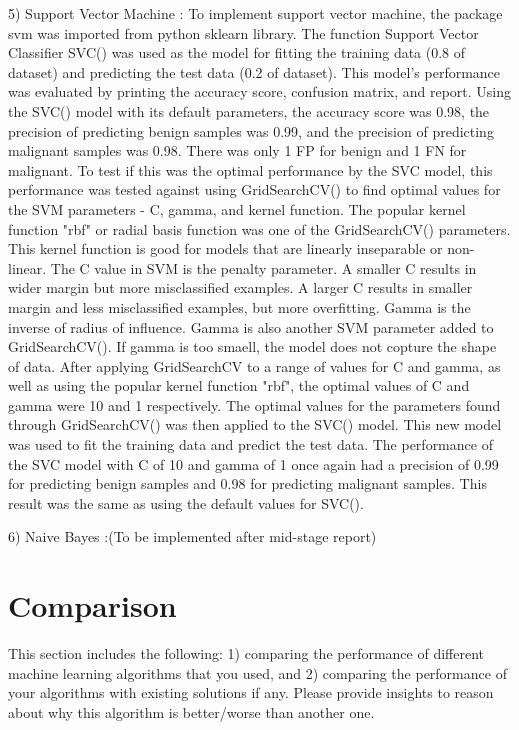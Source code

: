 \documentclass[conference]{IEEEtran}
\begin{document}
5) Support Vector Machine : To implement support vector machine, the package svm was imported from python sklearn library. The function Support Vector Classifier SVC() was used as the model for fitting the training data (0.8 of dataset) and predicting the test data (0.2 of dataset). This model's performance was evaluated by printing the accuracy score, confusion matrix, and report. Using the SVC() model with its default parameters, the accuracy score was 0.98, the precision of predicting benign samples was 0.99, and the precision of predicting malignant samples was 0.98. There was only 1 FP for benign and 1 FN for malignant. 
To test if this was the optimal performance by the SVC model, this performance was tested against using GridSearchCV() to find optimal values for the SVM parameters - C, gamma, and kernel function. The popular kernel function "rbf" or radial basis function was one of the GridSearchCV() parameters. This kernel function is good for models that are linearly inseparable or non-linear. The C value in SVM is the penalty parameter. A smaller C results in wider margin but more misclassified examples. A larger C results in smaller margin and less misclassified examples, but more overfitting. Gamma is the inverse of radius of influence. Gamma is also another SVM parameter added to GridSearchCV(). If gamma is too smaell, the model does not copture the shape of data. After applying GridSearchCV to a range of values for C and gamma, as well as using the popular kernel function "rbf", the optimal values of C and gamma were 10 and 1 respectively. 
The optimal values for the parameters found through GridSearchCV() was then applied to the SVC() model. This new model was used to fit the training data and predict the test data. The performance of the SVC model with C of 10 and gamma of 1 once again had a precision of 0.99 for predicting benign samples and 0.98 for predicting malignant samples. This result was the same as using the default values for SVC(). 

6) Naive Bayes :(To be implemented after mid-stage report)




\section{Comparison}  
This section includes the following: 1) comparing the performance of different machine learning algorithms that you used, and 2) comparing the performance of your algorithms with existing solutions if any. Please provide insights to reason about why this algorithm is better/worse than another one.
\end{document}
